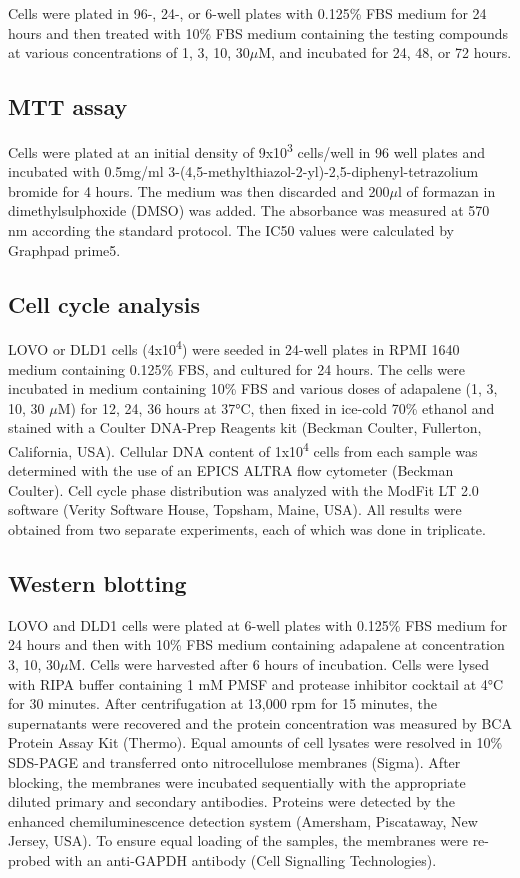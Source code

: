 \documentclass[10pt]{article}
\begin{document}
Cells were plated in 96-, 24-, or 6-well plates with 0.125\% FBS medium for 24 hours and then treated with 10\% FBS medium containing the testing compounds at various concentrations of 1, 3, 10, 30$\mu$M, and incubated for 24, 48, or 72 hours.

\subsection*{MTT assay}

Cells were plated at an initial density of 9x10\textsuperscript{3} cells/well in 96 well plates and incubated with 0.5mg/ml 3-(4,5-methylthiazol-2-yl)-2,5-diphenyl-tetrazolium bromide for 4 hours. The medium was then discarded and 200$\mu$l of formazan in dimethylsulphoxide (DMSO) was added. The absorbance was measured at 570 nm according the standard protocol. The IC50 values were calculated by Graphpad prime5.

\subsection*{Cell cycle analysis}

LOVO or DLD1 cells (4x10\textsuperscript{4}) were seeded in 24-well plates in RPMI 1640 medium containing 0.125\% FBS, and cultured for 24 hours. The cells were incubated in medium containing 10\% FBS and various doses of adapalene (1, 3, 10, 30 $\mu$M) for 12, 24, 36 hours at 37°C, then fixed in ice-cold 70\% ethanol and stained with a Coulter DNA-Prep Reagents kit (Beckman Coulter, Fullerton, California, USA). Cellular DNA content of 1x10\textsuperscript{4} cells from each sample was determined with the use of an EPICS ALTRA flow cytometer (Beckman Coulter). Cell cycle phase distribution was analyzed with the ModFit LT 2.0 software (Verity Software House, Topsham, Maine, USA). All results were obtained from two separate experiments, each of which was done in triplicate.

\subsection*{Western blotting}

LOVO and DLD1 cells were plated at 6-well plates with 0.125\% FBS medium for 24 hours and then with 10\% FBS medium containing adapalene at concentration 3, 10, 30$\mu$M. Cells were harvested after 6 hours of incubation. Cells were lysed with RIPA buffer containing 1 mM PMSF and protease inhibitor cocktail at 4°C for 30 minutes. After centrifugation at 13,000 rpm for 15 minutes, the supernatants were recovered and the protein concentration was measured by BCA Protein Assay Kit (Thermo). Equal amounts of cell lysates were resolved in 10\% SDS-PAGE and transferred onto nitrocellulose membranes (Sigma). After blocking, the membranes were incubated sequentially with the appropriate diluted primary and secondary antibodies. Proteins were detected by the enhanced chemiluminescence detection system (Amersham, Piscataway, New Jersey, USA). To ensure equal loading of the samples, the membranes were re-probed with an anti-GAPDH antibody (Cell Signalling Technologies).
\end{document}

